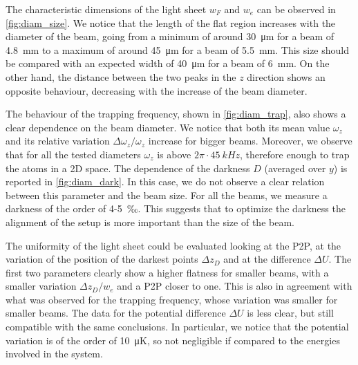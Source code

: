 The characteristic dimensions of the light sheet $w_F$ and $w_e$ can be observed in \cref{fig:diam_size}. We notice that  the length of the flat region increases with the diameter of the beam, going from a minimum of around \SI{30}{\micro m} for a beam of \SI{4.8}{mm} to a maximum of around \SI{45}{\micro m} for a beam of \SI{5.5}{mm}. This size should be compared with an expected width of \SI{40}{\micro m} for a beam of \SI{6}{mm}. On the other hand, the distance between the two peaks in the $z$ direction shows an opposite behaviour, decreasing with the increase of the beam diameter.

The behaviour of the trapping frequency, shown in \cref{fig:diam_trap}, also shows a clear dependence on the beam diameter. We notice that both its mean value $\omega_z$ and its relative variation $\Delta \omega_z / \omega_z$ increase for bigger beams. Moreover, we observe that for all the tested diameters $\omega_z$ is above $2\pi\cdot\SI{45}{kHz}$, therefore enough to trap the atoms in a 2D space. The dependence of the darkness $D$ (averaged over $y$) is reported in \cref{fig:diam_dark}. In this case, we do not observe a clear relation between this parameter and the beam size. For all the beams, we measure a darkness of the order of 4-5~‰. This suggests that to optimize the darkness the alignment of the setup is more important than the size of the beam.

The uniformity of the light sheet could be evaluated looking at the P2P, at the variation of the position of the darkest points $\Delta z_D$ and at the difference $\Delta U$. The first two parameters clearly show a higher flatness for smaller beams, with a smaller variation $\Delta z_D / w_e$ and a P2P closer to one. This is also in agreement with what was observed for the trapping frequency, whose variation was smaller for smaller beams. The data for the potential difference $\Delta U$ is less clear, but still compatible with the same conclusions. In particular, we notice that the potential variation is of the order of \SI{10}{\micro K}, so not negligible if compared to the energies involved in the system.

